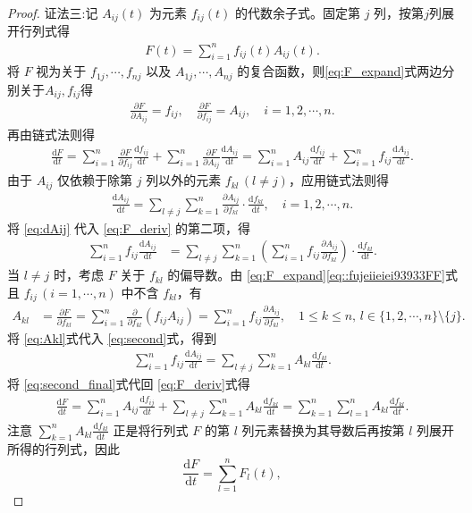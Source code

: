\documentclass[../../main.tex]{subfiles}%
\begin{document}
\begin{proof}
{\color{blue}证法三:}记 $A_{ij}(t)$ 为元素 $f_{ij}(t)$ 的代数余子式。固定第 $j$ 列，按第$j$列展开行列式得
\begin{align}
F(t) = \sum_{i=1}^n f_{ij}(t) A_{ij}(t). \label{eq:F_expand}
\end{align}
将 $F$ 视为关于 $f_{1j},\cdots,f_{nj}$ 以及 $A_{1j},\cdots,A_{nj}$ 的复合函数，则\eqref{eq:F_expand}式两边分别关于$A_{ij},f_{ij}$得
\begin{align}\label{eq::fujeiieiei93933FF}
\frac{\partial F}{\partial A_{ij}}=f_{ij},\quad \frac{\partial F}{\partial f_{ij}}=A_{ij},\quad i=1,2,\cdots,n. 
\end{align}
再由链式法则得
\begin{align}
\frac{\mathrm{d}F}{\mathrm{d}t}
= \sum_{i=1}^n \frac{\partial F}{\partial f_{ij}}\frac{\mathrm{d}f_{ij}}{\mathrm{d}t}
+ \sum_{i=1}^n \frac{\partial F}{\partial A_{ij}}\frac{\mathrm{d}A_{ij}}{\mathrm{d}t} = \sum_{i=1}^n A_{ij}\frac{\mathrm{d}f_{ij}}{\mathrm{d}t}
+ \sum_{i=1}^n f_{ij}\frac{\mathrm{d}A_{ij}}{\mathrm{d}t}. \label{eq:F_deriv}
\end{align}
由于 $A_{ij}$ 仅依赖于除第 $j$ 列以外的元素 $f_{kl}\,(l\ne j)$，应用链式法则得
\begin{align}
\frac{\mathrm{d}A_{ij}}{\mathrm{d}t}
= \sum_{l\ne j}\sum_{k=1}^n \frac{\partial A_{ij}}{\partial f_{kl}}\cdot \frac{\mathrm{d}f_{kl}}{\mathrm{d}t},\quad i=1,2,\cdots,n. \label{eq:dAij}
\end{align}
将 \eqref{eq:dAij} 代入 \eqref{eq:F_deriv} 的第二项，得
\begin{align}
\sum_{i=1}^n f_{ij}\frac{\mathrm{d}A_{ij}}{\mathrm{d}t}
&= \sum_{l\ne j}\sum_{k=1}^n
\left( \sum_{i=1}^n f_{ij}\frac{\partial A_{ij}}{\partial f_{kl}} \right)
\cdot \frac{\mathrm{d}f_{kl}}{\mathrm{d}t}. \label{eq:second}
\end{align}
当 $l\ne j$ 时，考虑 $F$ 关于 $f_{kl}$ 的偏导数。由 \eqref{eq:F_expand}\eqref{eq::fujeiieiei93933FF}式且 $f_{ij}\,(i=1,\cdots,n)$ 中不含 $f_{kl}$，有
\begin{align}
A_{kl}
&= \frac{\partial F}{\partial f_{kl}}
= \sum_{i=1}^n \frac{\partial}{\partial f_{kl}}\left( f_{ij}A_{ij} \right)
= \sum_{i=1}^n f_{ij}\frac{\partial A_{ij}}{\partial f_{kl}},\quad 1\leqslant k\leqslant n,\,l\in \{1,2,\cdots,n\}\setminus \{j\}. \label{eq:Akl}
\end{align}
将 \eqref{eq:Akl}式代入 \eqref{eq:second}式，得到
\begin{align}
\sum_{i=1}^n f_{ij}\frac{\mathrm{d}A_{ij}}{\mathrm{d}t}
= \sum_{l\ne j}\sum_{k=1}^n A_{kl}\frac{\mathrm{d}f_{kl}}{\mathrm{d}t}. \label{eq:second_final}
\end{align}
将 \eqref{eq:second_final}式代回 \eqref{eq:F_deriv}式得
\begin{align*}
\frac{\mathrm{d}F}{\mathrm{d}t}
= \sum_{i=1}^n A_{ij}\frac{\mathrm{d}f_{ij}}{\mathrm{d}t}
+ \sum_{l\ne j}\sum_{k=1}^n A_{kl}\frac{\mathrm{d}f_{kl}}{\mathrm{d}t} = \sum_{k=1}^n \sum_{l=1}^n A_{kl}\frac{\mathrm{d}f_{kl}}{\mathrm{d}t}.
\end{align*}
注意 $\sum_{k=1}^n A_{kl}\frac{\mathrm{d}f_{kl}}{\mathrm{d}t}$ 正是将行列式 $F$ 的第 $l$ 列元素替换为其导数后再按第 $l$ 列展开所得的行列式，因此
\[
\frac{\mathrm{d}F}{\mathrm{d}t} = \sum_{l=1}^n F_l(t),
\]\end{proof}
\end{document}
